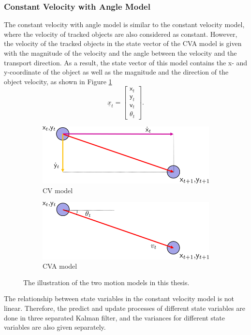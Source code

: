 
\subsubsection{Constant Velocity with Angle Model}

The constant velocity with angle model is similar to the constant velocity model, where the velocity of tracked objects are also considered as constant. However, the velocity of the tracked objects in the state vector of the CVA model is given with the magnitude of the velocity and the angle between the velocity and the transport direction. As a result, the state vector of this model contains the x- and y-coordinate of the object as well as the magnitude and the direction of the object velocity, as shown in Figure \ref{CVA}
\begin{equation}
    \underline{x}_{t}=
    \begin{bmatrix}
        \mathsf{x}_{t}\\ 
        \mathsf{y}_{t}\\ 
        \mathsf{v}_{t}\\ 
        \theta_{t}
    \end{bmatrix}.
\end{equation}
\begin{figure}[htbp]
	\centering
	\begin{subfigure}[t]{0.49\textwidth}
		\includegraphics[width=\textwidth]{figures/CVmodel.png}
		\caption{CV model}
	\end{subfigure}
	\begin{subfigure}[t]{0.49\textwidth}
		\includegraphics[width=\textwidth]{figures/CVAmodel.png}
		\caption{CVA model}
		\label{CVA}
	\end{subfigure}
	\caption{The illustration of the two motion models in this thesis.}
	\label{motion model}
\end{figure}
The relationship between state variables in the constant velocity model is not linear. Therefore, the predict and update processes of different state variables are done in three separated Kalman filter, and the variances for different state variables are also given separately. 

